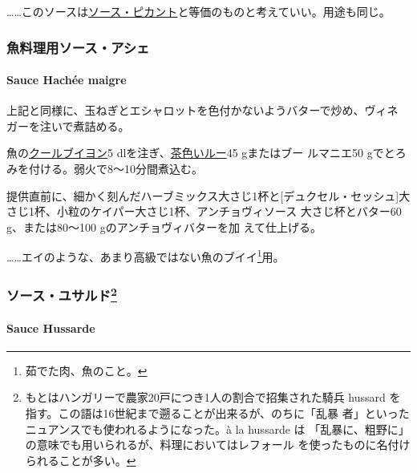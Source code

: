 \begin{recette}
\ldots{}\ldots{}このソースは\protect\hyperlink{ux30bdux30fcux30b9ux30d4ux30abux30f3ux30c8}{ソース・ピカント}と等価のものと考えていい。用途も同じ。

\maeaki

\hypertarget{ux9b5aux6599ux7406ux7528ux30bdux30fcux30b9ux30a2ux30b7ux30a7}{%
\subsubsection{魚料理用ソース・アシェ}\label{ux9b5aux6599ux7406ux7528ux30bdux30fcux30b9ux30a2ux30b7ux30a7}}

\hypertarget{sauce-hachee-maigre}{%
\paragraph{Sauce Hachée maigre}\label{sauce-hachee-maigre}}

上記と同様に、玉ねぎとエシャロットを色付かないようバターで炒め、ヴィネ
ガーを注いで煮詰める。

魚の\href{}{クールブイヨン}5
dlを注ぎ、\protect\hyperlink{roux-brun}{茶色いルー}45 gまたはブー
ルマニエ50 gでとろみを付ける。弱火で8〜10分間煮込む。

提供直前に、細かく刻んだハーブミックス大さじ1杯と{[}デュクセル・セッシュ{]}大
さじ1\undemi{}杯、小粒のケイパー大さじ1\undemi{}杯、アンチョヴィソース
大さじ\undemi{}杯とバター60 g、または80〜100 gのアンチョヴィバターを加
えて仕上げる。

\ldots{}\ldots{}エイのような、あまり高級ではない魚のブイイ\footnote{茹でた肉、魚のこと。}用。

\maeaki

\hypertarget{ux30bdux30fcux30b9ux30e6ux30b5ux30ebux30c951}{%
\subsubsection[ソース・ユサルド]{\texorpdfstring{ソース・ユサルド\footnote{もとはハンガリーで農家20戸につき1人の割合で招集された騎兵
  hussard を指す。この語は16世紀まで遡ることが出来るが、のちに「乱暴
  者」といったニュアンスでも使われるようになった。à la hussarde は
  「乱暴に、粗野に」の意味でも用いられるが、料理においてはレフォール
  を使ったものに名付けられることが多い。}}{ソース・ユサルド}}\label{ux30bdux30fcux30b9ux30e6ux30b5ux30ebux30c951}}

\hypertarget{sauce-hussarde}{%
\paragraph{Sauce Hussarde}\label{sauce-hussarde}}


\end{recette}
